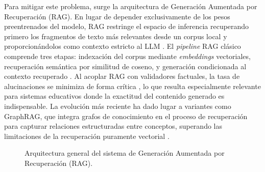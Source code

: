 Para mitigar este problema, surge la arquitectura de Generación Aumentada por Recuperación 
(RAG). En lugar de depender exclusivamente de los pesos preentrenados del modelo, RAG 
restringe el espacio de inferencia recuperando primero los fragmentos de texto más 
relevantes desde un corpus local y proporcionándolos como contexto estricto al LLM 
\textcite{Kannammal2024}. El \textit{pipeline} RAG clásico comprende tres etapas: 
indexación del corpus mediante \textit{embeddings} vectoriales, recuperación semántica 
por similitud de coseno, y generación condicionada al contexto recuperado 
\parencite{GaoRAGSurvey2024}. Al acoplar RAG con validadores factuales, la tasa de 
alucinaciones se minimiza de forma crítica \textcite{Ning2025}, lo que resulta 
especialmente relevante para sistemas educativos donde la exactitud del contenido generado 
es indispensable. La evolución más reciente ha dado lugar a variantes como GraphRAG, que 
integra grafos de conocimiento en el proceso de recuperación para capturar relaciones 
estructuradas entre conceptos, superando las limitaciones de la recuperación puramente 
vectorial \parencite{KleselWittmannRAG2025}.

\begin{figure}[H]
    \centering
    \caption{Arquitectura general del sistema de Generación Aumentada por Recuperación (RAG).}
    \label{fig:rag_architecture}
\end{figure}

